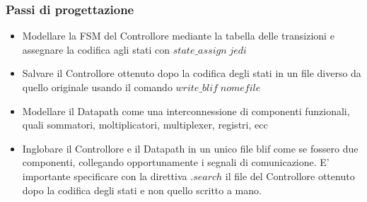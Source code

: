 \documentclass[a4paper]{article}
\theoremstyle{break}
\theoremstyle{break}
\theoremstyle{break}
\theoremstyle{break}
\begin{document}
\subsubsection{Passi di progettazione}
\begin{itemize}
  \item Modellare la FSM del Controllore mediante la tabella delle transizioni e assegnare la
    codifica agli stati con \( state\_assign\;jedi \) 
  \item Salvare il Controllore ottenuto dopo la codifica degli stati in un file diverso da quello
    originale usando il comando \( write\_blif\;nomefile \) 
  \item Modellare il Datapath come una interconnessione di componenti funzionali, quali
    sommatori, moltiplicatori, multiplexer, registri, ecc
  \item Inglobare il Controllore e il Datapath in un unico file blif come se fossero due
    componenti, collegando opportunamente i segnali di comunicazione. E’ importante
    specificare con la direttiva \( .search \) il file del Controllore ottenuto dopo la codifica
    degli stati e non quello scritto a mano.
\end{itemize}
\end{document}
